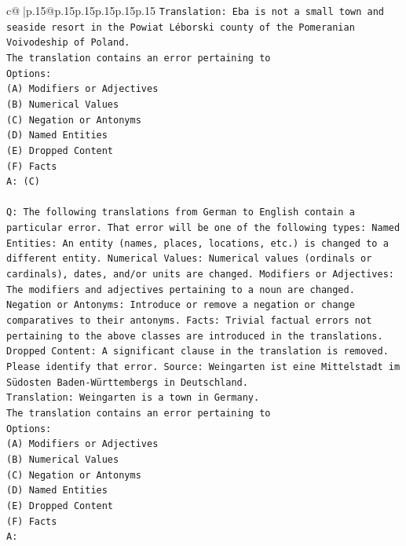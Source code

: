 \documentclass{article}
\begin{document}
{\begin{supertabular}{c@{$\;$}|p{.15\linewidth}@{}p{.15\linewidth}p{.15\linewidth}p{.15\linewidth}p{.15\linewidth}p{.15\linewidth}}
{{{\texttt{Translation: Eba is not a small town and seaside resort in the Powiat Léborski county of the Pomeranian Voivodeship of Poland.} \\
\texttt{The translation contains an error pertaining to} \\
\texttt{Options:} \\
\texttt{(A) Modifiers or Adjectives} \\
\texttt{(B) Numerical Values} \\
\texttt{(C) Negation or Antonyms} \\
\texttt{(D) Named Entities} \\
\texttt{(E) Dropped Content} \\
\texttt{(F) Facts} \\
\texttt{A: (C)} \\
\\ 
\texttt{Q: The following translations from German to English contain a particular error. That error will be one of the following types: Named Entities: An entity (names, places, locations, etc.) is changed to a different entity. Numerical Values: Numerical values (ordinals or cardinals), dates, and/or units are changed. Modifiers or Adjectives: The modifiers and adjectives pertaining to a noun are changed. Negation or Antonyms: Introduce or remove a negation or change comparatives to their antonyms. Facts: Trivial factual errors not pertaining to the above classes are introduced in the translations. Dropped Content: A significant clause in the translation is removed. Please identify that error.  Source: Weingarten ist eine Mittelstadt im Südosten Baden{-}Württembergs in Deutschland.} \\
\texttt{Translation: Weingarten is a town in Germany.} \\
\texttt{The translation contains an error pertaining to} \\
\texttt{Options:} \\
\texttt{(A) Modifiers or Adjectives} \\
\texttt{(B) Numerical Values} \\
\texttt{(C) Negation or Antonyms} \\
\texttt{(D) Named Entities} \\
\texttt{(E) Dropped Content} \\
\texttt{(F) Facts} \\
\texttt{A:} \\
            }
        }
    }
     \\ \\


\end{supertabular}}
\end{document}
